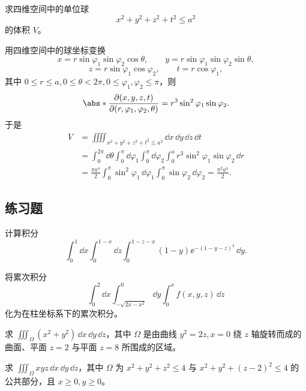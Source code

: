 \begin{xexample}[22.3.5]
求四维空间中的单位球
\[
  x^2+y^2+z^2+t^2\le a^2
\]
的体积 $V$。
\end{xexample}
\begin{xsolution}
用四维空间中的球坐标变换
\begin{equation}
  x=r\sin\varphi_1\sin\varphi_2\cos\theta,\qquad
  y=r\sin\varphi_1\sin\varphi_2\sin\theta,
  \tag{22.5}
  \label{eq:22.5}
\end{equation}
\begin{equation}
  z=r\sin\varphi_1\cos\varphi_2,\qquad
  t=r\cos\varphi_1,
  \tag{22.6}
  \label{eq:22.6}
\end{equation}
其中 $0\le r\le a,0\le\theta<2\pi,0\le\varphi_1,\varphi_2\le\pi$，则
\[
  \abs*{\frac{\partial(x,y,z,t)}{\partial(r,\varphi_1,\varphi_2,\theta)}}
  =r^3\sin^2\varphi_1\sin\varphi_2.
\]
于是
\begin{align*}
  V&=\iiiint_{x^2+y^2+z^2+t^2\le a^2}\dd x\,\dd y\,\dd z\,\dd t\\
  &=\int_0^{2\pi}\dd\theta\int_0^\pi\dd\varphi_1\int_0^\pi\dd\varphi_2\int_0^a
  r^3\sin^2\varphi_1\sin\varphi_2\,\dd r\\
  &=\frac{\pi a^4}{2}\int_0^\pi\sin^2\varphi_1\,\dd\varphi_1\int_0^\pi\sin\varphi_2\,\dd\varphi_2
  =\frac{\pi^2a^4}{2}.
\end{align*}
\end{xsolution}

\subsection{练习题}

\begin{xexercise}[1]
计算积分
  \[
    \int_0^1\dd x\int_0^{1-x}\dd z\int_0^{1-z-x}(1-y)\ee^{-(1-y-z)^2}\,\dd y.
  \]
\end{xexercise}

\begin{xexercise}[2]
将累次积分
  \[
    \int_0^2\dd x\int_{-\sqrt{2x-x^2}}^0\dd y\int_0^x f(x,y,z)\,\dd z
  \]
  化为在柱坐标系下的累次积分。
\end{xexercise}

\begin{xexercise}[3]
求 $\displaystyle\iiint_\Omega(x^2+y^2)\,\dd x\,\dd y\,\dd z$，其中 $\Omega$ 是由曲线 $y^2=2z,x=0$ 绕 $z$ 轴旋转而成的曲面、平面 $z=2$ 与平面 $z=8$ 所围成的区域。
\end{xexercise}

\begin{xexercise}[4]
求 $\displaystyle\iiint_\Omega xyz\,\dd x\,\dd y\,\dd z$，其中 $\Omega$ 为 $x^2+y^2+z^2\le4$ 与 $x^2+y^2+(z-2)^2\le4$ 的公共部分，且 $x\ge0,y\ge0$。
\end{xexercise}

